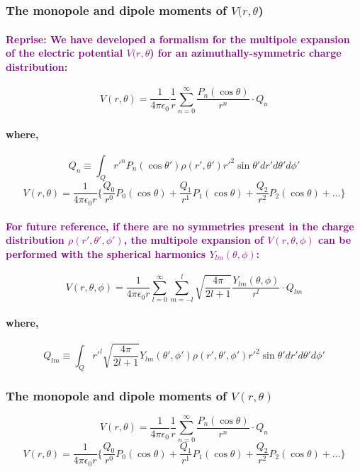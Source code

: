 \documentclass{article}
\begin{document}
\subsubsection{The monopole and dipole moments of $V(r,\theta$)}
\paragraph{\textcolor{purple}{Reprise: We have developed a formalism for the multipole expansion of the electric potential $V(r,\theta$) for an azimuthally-symmetric charge distribution:}}
\begin{equation*}
    V(r,\theta)=\frac{1}{4\pi\epsilon_0}\frac{1}{r}\sum_{n=0}^{\infty}\frac{P_n(\cos\theta)}{r^n}\cdot Q_n
\end{equation*}
\paragraph{where,}
\begin{equation*}
    Q_n\equiv\int_Q r'^nP_n(\cos\theta')\rho(r',\theta')r'^2\sin\theta'dr'd\theta'd\phi'
\end{equation*}
\begin{equation*}
    V(r,\theta)=\frac{1}{4\pi\epsilon_0r}\bigg\{ \frac{Q_0}{r^0}P_0(\cos\theta)+\frac{Q_1}{r^1}P_1(\cos\theta)+\frac{Q_2}{r^2}P_2(\cos\theta)+\dots\bigg\}
\end{equation*}
\paragraph{\textcolor{purple}{For future reference, if there are no symmetries present in the charge distribution $\rho(r',\theta',\phi')$, the multipole expansion of $V(r,\theta,\phi)$ can be performed with the spherical harmonics $Y_{lm}(\theta,\phi)$:}}
\begin{equation*}
    V(r,\theta,\phi)=\frac{1}{4\pi\epsilon_0r}\sum_{l=0}^{\infty}\sum_{m=-l}^{l}\sqrt{\frac{4\pi}{2l+1}}\frac{Y_{lm}(\theta,\phi)}{r^l}\cdot Q_{lm}
\end{equation*}
\paragraph{where,}
\begin{equation*}
    Q_{lm}\equiv\int_Q r'^l\sqrt{\frac{4\pi}{2l+1}}Y_{lm}(\theta',\phi')\rho(r',\theta',\phi')r'^2\sin\theta'dr'd\theta'd\phi'
\end{equation*}
\subsubsection{The monopole and dipole moments of $V(r,\theta)$}
\begin{equation*}
    V(r,\theta)=\frac{1}{4\pi\epsilon_0}\frac{1}{r}\sum_{n=0}^{\infty}\frac{P_n(\cos\theta)}{r^n}\cdot Q_n
\end{equation*}
\begin{equation*}
     V(r,\theta)=\frac{1}{4\pi\epsilon_0r}\bigg\{ \frac{Q_0}{r^0}P_0(\cos\theta)+\frac{Q_1}{r^1}P_1(\cos\theta)+\frac{Q_2}{r^2}P_2(\cos\theta)+\dots\bigg\}
\end{equation*}
\end{document}
